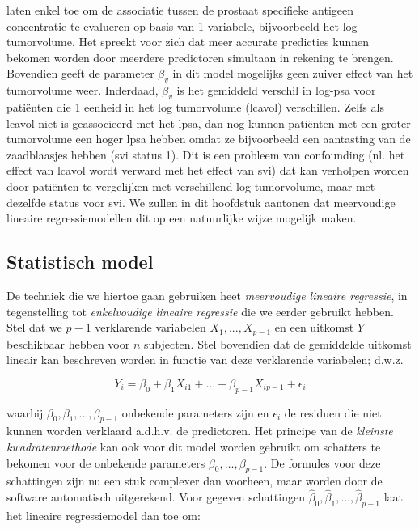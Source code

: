 \documentclass[
  12pt,dutch,coursenotes]{book}
\theoremstyle{definition}
\theoremstyle{definition}
\theoremstyle{definition}
\theoremstyle{remark}
\begin{document}
laten enkel toe om de associatie tussen de prostaat specifieke antigeen concentratie te evalueren op basis van 1 variabele, bijvoorbeeld het log-tumorvolume. Het spreekt voor zich dat meer accurate predicties kunnen bekomen worden door meerdere predictoren simultaan in rekening te brengen.
Bovendien geeft de parameter \(\beta_v\) in dit model mogelijks geen zuiver effect van het tumorvolume weer. Inderdaad, \(\beta_v\) is het gemiddeld verschil in log-psa voor patiënten die 1 eenheid in het log tumorvolume (lcavol) verschillen. Zelfs als lcavol niet is geassocieerd met het lpsa, dan nog kunnen patiënten met een groter tumorvolume een hoger lpsa hebben omdat ze bijvoorbeeld een aantasting van de zaadblaasjes hebben (svi status 1). Dit is een probleem van confounding (nl. het effect van lcavol wordt verward met het effect van svi) dat kan verholpen worden door patiënten te vergelijken met verschillend log-tumorvolume, maar met dezelfde status voor svi. We zullen in dit hoofdstuk aantonen dat meervoudige lineaire regressiemodellen dit op een natuurlijke wijze mogelijk maken.

\hypertarget{statistisch-model}{%
\subsection{Statistisch model}\label{statistisch-model}}

De techniek die we hiertoe gaan gebruiken heet \emph{meervoudige lineaire regressie}, in tegenstelling tot \emph{enkelvoudige lineaire regressie} die we eerder gebruikt hebben.
Stel dat we \(p-1\) verklarende variabelen \(X_1,...,X_{p-1}\) en een uitkomst \(Y\) beschikbaar hebben voor \(n\)
subjecten.
Stel bovendien dat de gemiddelde uitkomst lineair kan beschreven worden in functie van deze verklarende variabelen; d.w.z.

\[
Y_i =\beta_0 + \beta_1 X_{i1} + ... +\beta_{p-1} X_{ip-1} + \epsilon_i
\]

waarbij \(\beta_0,\beta_1,...,\beta_{p-1}\) onbekende parameters zijn en \(\epsilon_i\) de residuen die niet kunnen worden verklaard a.d.h.v. de predictoren.
Het principe van de \emph{kleinste kwadratenmethode} kan ook voor dit model worden gebruikt om schatters te bekomen voor de onbekende parameters
\(\beta_0, \ldots, \beta_{p-1}\).
De formules voor deze schattingen zijn nu een stuk complexer dan voorheen, maar worden door de software automatisch uitgerekend.
Voor gegeven
schattingen \(\hat{\beta}_0,\hat{\beta}_1,...,\hat{\beta}_{p-1}\) laat het lineaire
regressiemodel dan toe om:
\end{document}
